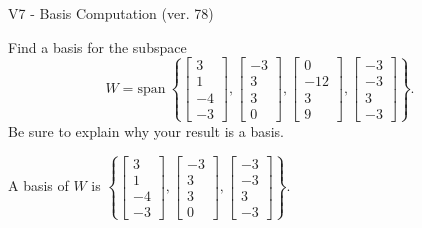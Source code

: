 \begin{exercise}
  \begin{exerciseTitle}V7 - Basis Computation (ver. 78)\end{exerciseTitle}
  \begin{exerciseStatement}
    Find a basis for the subspace 
\[W=\mathrm{span}\ \left\{\left[\begin{array}{r}
3 \\
1 \\
-4 \\
-3
\end{array}\right] , \left[\begin{array}{r}
-3 \\
3 \\
3 \\
0
\end{array}\right] , \left[\begin{array}{r}
0 \\
-12 \\
3 \\
9
\end{array}\right] , \left[\begin{array}{r}
-3 \\
-3 \\
3 \\
-3
\end{array}\right]\right\}.\]
 Be sure to explain why your result is a basis.


  \end{exerciseStatement}
  \begin{exerciseAnswer}
   A basis of \(W\) is  \(\left\{\left[\begin{array}{r}
3 \\
1 \\
-4 \\
-3
\end{array}\right] , \left[\begin{array}{r}
-3 \\
3 \\
3 \\
0
\end{array}\right] , \left[\begin{array}{r}
-3 \\
-3 \\
3 \\
-3
\end{array}\right]\right\}\).
  


  \end{exerciseAnswer}
\end{exercise}